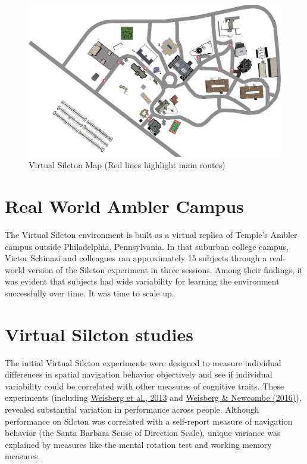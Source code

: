 \documentclass[
  12pt,
]{book}
\begin{document}
\begin{figure}
\centering
\includegraphics{./figs/Full_Info_Silcton_map_NoBG.jpg}
\caption{Virtual Silcton Map (Red lines highlight main routes)}
\end{figure}

\hypertarget{real-world-ambler-campus}{%
\section{Real World Ambler Campus}\label{real-world-ambler-campus}}

The Virtual Silcton environment is built as a virtual replica of Temple's Ambler campus outside Philadelphia, Pennsylvania. In that suburban college campus, Victor Schinazi and colleagues ran approximately 15 subjects through a real-world version of the Silcton experiment in three sessions. Among their findings, it was evident that subjects had wide variability for learning the environment successfully over time. It was time to scale up.

\hypertarget{virtual-silcton-studies}{%
\section{Virtual Silcton studies}\label{virtual-silcton-studies}}

The initial Virtual Silcton experiments were designed to measure individual differences in spatial navigation behavior objectively and see if individual variability could be correlated with other measures of cognitive traits. These experiments (including \href{https://psycnet.apa.org/fulltext/2013-44238-001.html}{Weisberg et al., 2013} and \href{https://psycnet.apa.org/fulltext/2015-52470-001.html}{Weisberg \& Newcombe (2016)}), revealed substantial variation in performance across people. Although performance on Silcton was correlated with a self-report measure of navigation behavior (the Santa Barbara Sense of Direction Scale), unique variance was explained by measures like the mental rotation test and working memory measures.
\end{document}
